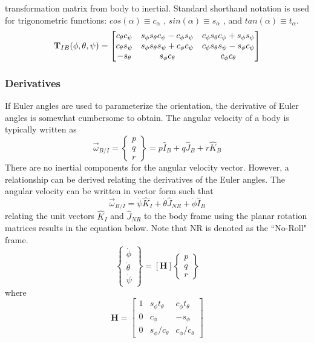 \documentclass{article}
\begin{document}
transformation matrix from body to inertial. Standard shorthand
notation is used for trigonometric functions: $ cos(\alpha) \equiv
c_{\alpha} $ , $ sin(\alpha) \equiv s_{\alpha} $ , and $ tan(\alpha)
\equiv t_{\alpha} $.
\begin{equation}\label{e:TIB}
{\bf T}_{IB}(\phi,\theta,\psi) = \begin{bmatrix} c_{\theta}c_{\psi} &
s_{\phi}s_{\theta}c_{\psi}-c_{\phi}s_{\psi} &
c_{\phi}s_{\theta}c_{\psi} + s_{\phi}s_{\psi} \\ c_{\theta}s_{\psi} &
s_{\phi}s_{\theta}s_{\psi} + c_{\phi}c_{\psi} &
c_{\phi}s_{\theta}s_{\psi} - s_{\phi}c_{\psi} \\
-s_{\theta} & s_{\phi}c_{\theta} & c_{\phi}c_{\theta}
\end{bmatrix}
\end{equation}

\subsubsection{Derivatives}

If Euler angles are used to parameterize the orientation, the
derivative of Euler angles is somewhat cumbersome to obtain. The angular
velocity of a body is typically written as
\begin{equation}
\vec{\omega}_{B/I} = \begin{Bmatrix} p \\ q
  \\ r \end{Bmatrix} = p \hat{I}_B + q \hat{J}_B + r \hat{K}_B
\end{equation}
There are no inertial components for the angular velocity
vector. However, a relationship can be derived relating the
derivatives of the Euler angles. The angular velocity can be written
in vector form such that
\begin{equation}
\vec{\omega}_{B/I} = \dot{\psi} \hat{K}_I + \dot{\theta} \hat{J}_{NR} +
\dot{\phi} \hat{I}_B
\end{equation}
relating the unit vectors $\hat{K}_I$ and $\hat{J}_{NR}$ to the body
frame using the planar rotation matrices results in the equation
below. Note that NR is denoted as the ``No-Roll" frame.
\begin{equation}\label{e:ptpdot}
\begin{Bmatrix} \dot{\phi} \\ \dot{\theta} \\ \dot{\psi} \end{Bmatrix}
= [\textbf{H}]
\begin{Bmatrix} p\\q\\r\end{Bmatrix}
\end{equation}
where
\begin{equation}
\textbf{H}=\begin{bmatrix} 1 & s_{\phi}t_{\theta} & c_{\phi}t_{\theta} \\ 0 &
c_{\phi} & -s_{\phi} \\ 0 & s_{\phi}/c_{\theta} &
c_{\phi}/c_{\theta} \end{bmatrix}
\end{equation}
\end{document}
